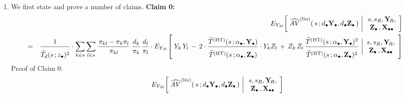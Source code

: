 \begin{enumerate}
\item
    We first state and prove a number of claims.
    \vskip 0.3cm
    \noindent
    \textbf{Claim 0:}\quad
    \begin{eqnarray*}
    &&
        E_{Y_{M}}\!\left[\;
            \widehat{AV}^{\textnormal{(lin)}}(\,s\,;\dbullet\Ydot,\dbullet\Zdot\,)
            \,\left\vert\,
            \begin{array}{c}
                s,s_{R},\YsubR, \\ \Zdot\,,\Xobs
                \end{array}
            \right.
            \!\right]
    \\
    & = &
        \dfrac{1}{
            \overset{{\color{white}.}}{\widehat{T}_{d}(s\,;\zdot)^{2}}
            }
        \cdot
        \underset{k \in s}{\sum}\,
        \underset{l \in s}{\sum}\;
        \dfrac{\pi_{kl} - \pi_{k}\pi_{l}}{\pi_{kl}}\;
        \dfrac{d_{k}}{\pi_{k}}\,
        \dfrac{d_{l}}{\pi_{l}}
        \cdot
        E_{Y_{M}}\!\left[\;
            Y_{k}\,Y_{l}
            \, - \,
            {\color{black}2}
            \cdot
            \dfrac{
                \widehat{T}^{\textnormal{(HT)}}(s\,;\abullet,\Ydot)
                }{
                \overset{{\color{white}.}}{\widehat{T}^{\textnormal{(HT)}}(s\,;\abullet,\Zdot)}
                }
            \cdot
            {\color{black}Y_{k}Z_{l}}
            \, + \,
            Z_{k}\,Z_{l}\,
            \dfrac{
                \widehat{T}^{\textnormal{(HT)}}(s\,;\abullet,\Ydot)^{2}
                }{
                \overset{{\color{white}.}}{\widehat{T}^{\textnormal{(HT)}}(s\,;\abullet,\Zdot)^{2}}
                }
            \,\left\vert
            \begin{array}{c}
                s,s_{R},\YsubR, \\ \Zdot\,,\Xobs
                \end{array}
            \right.
            \!\right]
    \end{eqnarray*}
    \vskip 0.1cm
    \noindent
    Proof of Claim 0:\;\;
    \begin{eqnarray*}
    &&
        E_{Y_{M}}\!\left[\;
            \widehat{AV}^{\textnormal{(lin)}}(\,s\,;\dbullet\Ydot,\dbullet\Zdot\,)
            \,\left\vert\,
            \begin{array}{c}
                s,s_{R},\YsubR, \\ \Zdot\,,\Xobs
                \end{array}
            \right.
            \!\right]
    \\

\end{eqnarray*}
\end{enumerate}

